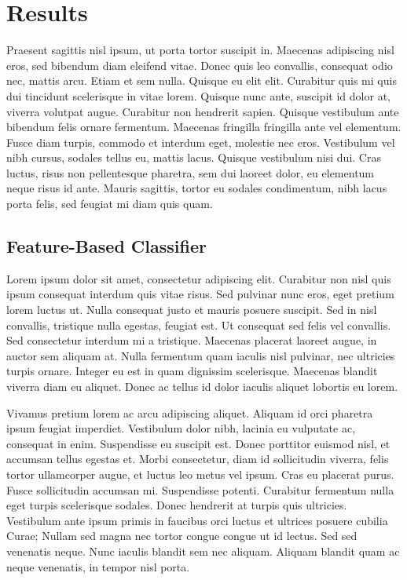 \documentclass[final,5p,times,twocolumn]{elsarticle}
\begin{document}
\section{Results}
\label{results}

Praesent sagittis nisl ipsum, ut porta tortor suscipit in. Maecenas adipiscing
nisl eros, sed bibendum diam eleifend vitae. Donec quis leo convallis,
consequat odio nec, mattis arcu. Etiam et sem nulla. Quisque eu elit elit.
Curabitur quis mi quis dui tincidunt scelerisque in vitae lorem. Quisque nunc
ante, suscipit id dolor at, viverra volutpat augue. Curabitur non hendrerit
sapien. Quisque vestibulum ante bibendum felis ornare fermentum. Maecenas
fringilla fringilla ante vel elementum. Fusce diam turpis, commodo et interdum
eget, molestie nec eros. Vestibulum vel nibh cursus, sodales tellus eu, mattis
lacus. Quisque vestibulum nisi dui. Cras luctus, risus non pellentesque
pharetra, sem dui laoreet dolor, eu elementum neque risus id ante. Mauris
sagittis, tortor eu sodales condimentum, nibh lacus porta felis, sed feugiat mi
diam quis quam.

\subsection{Feature-Based Classifier}
\label{results:featurebased}

Lorem ipsum dolor sit amet, consectetur adipiscing elit. Curabitur non nisl
quis ipsum consequat interdum quis vitae risus. Sed pulvinar nunc eros, eget
pretium lorem luctus ut. Nulla consequat justo et mauris posuere suscipit. Sed
in nisl convallis, tristique nulla egestas, feugiat est. Ut consequat sed felis
vel convallis. Sed consectetur interdum mi a tristique. Maecenas placerat
laoreet augue, in auctor sem aliquam at. Nulla fermentum quam iaculis nisl
pulvinar, nec ultricies turpis ornare. Integer eu est in quam dignissim
scelerisque. Maecenas blandit viverra diam eu aliquet. Donec ac tellus id dolor
iaculis aliquet lobortis eu lorem.

Vivamus pretium lorem ac arcu adipiscing aliquet. Aliquam id orci pharetra
ipsum feugiat imperdiet. Vestibulum dolor nibh, lacinia eu vulputate ac,
consequat in enim. Suspendisse eu suscipit est. Donec porttitor euismod nisl,
et accumsan tellus egestas et. Morbi consectetur, diam id sollicitudin viverra,
felis tortor ullamcorper augue, et luctus leo metus vel ipsum. Cras eu placerat
purus. Fusce sollicitudin accumsan mi. Suspendisse potenti. Curabitur fermentum
nulla eget turpis scelerisque sodales. Donec hendrerit at turpis quis
ultricies. Vestibulum ante ipsum primis in faucibus orci luctus et ultrices
posuere cubilia Curae; Nullam sed magna nec tortor congue congue ut id lectus.
Sed sed venenatis neque. Nunc iaculis blandit sem nec aliquam. Aliquam blandit
quam ac neque venenatis, in tempor nisl porta.
\end{document}
